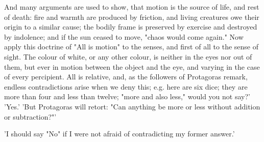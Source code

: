 And many arguments are used to show, that motion is the source of life,
and rest of death: fire and warmth are produced by friction, and living
creatures owe their origin to a similar cause; the bodily frame is
preserved by exercise and destroyed by indolence; and if the sun ceased
to move, "chaos would come again." Now apply this doctrine of "All
is motion" to the senses, and first of all to the sense of sight. The
colour of white, or any other colour, is neither in the eyes nor out of
them, but ever in motion between the object and the eye, and varying in
the case of every percipient. All is relative, and, as the followers of
Protagoras remark, endless contradictions arise when we deny this; e.g.
here are six dice; they are more than four and less than twelve; "more
and also less," would you not say?' 'Yes.' 'But Protagoras will retort:
"Can anything be more or less without addition or subtraction?"'

'I should say "No" if I were not afraid of contradicting my former
answer.'


